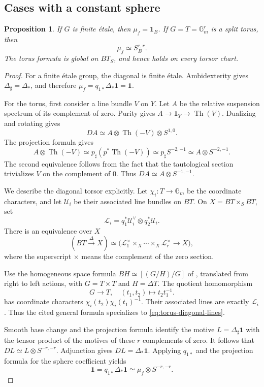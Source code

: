 \documentclass[11pt,reqno]{amsart}
\newtheorem{proposition}[theorem]{Proposition}
\theoremstyle{definition}
\theoremstyle{remark}
\theoremstyle{plain}
\numberwithin{equation}{section}
\newcommand{\one}{\mathbf 1}
\newcommand{\Gm}{\mathbb G_m}
\DeclareMathOperator{\Th}{Th}
\begin{document}
\subsection{Cases with a constant sphere}
\begin{proposition}\label{prop:new-finite-torus-twists}
If \(G\) is finite \'etale, then \(\mu_f=\one_B\).
If \(G=T=\Gm^r\) is a split torus, then
\[
 \mu_f\simeq S^{r,r}_B.
\]
The torus formula is global on \(BT_S\), and hence holds on every torsor chart.
\end{proposition}
\begin{proof}
For a finite \'etale group, the diagonal is finite \'etale.
Ambidexterity gives \(\Delta_\sharp=\Delta_*\), and therefore
\(\mu_f=q_{1*}\Delta_*\one=\one\).

For the torus, first consider a line bundle \(V\) on \(Y\).
Let \(A\) be the relative suspension spectrum of its complement of zero.
Purity gives \(A\to\one_Y\to\Th(V)\).
Dualizing and rotating gives
\[
 DA\simeq A\otimes\Th(-V)\otimes S^{1,0}.
\]
The projection formula gives
\[A\otimes\Th(-V) \simeq p_{\sharp}(p^*\Th(-V)) \simeq p_{\sharp}S^{-2, -1} 
\simeq A\otimes S^{-2,-1}.\]
The second equivalence follows from the fact that the tautological section trivializes \(V\)
on the complement of 0.
Thus \(DA\simeq A\otimes S^{-1,-1}\).

We describe the diagonal torsor explicitly.
Let \(\chi_i:T\to\Gm\) be the coordinate characters, and let
\(\mathcal U_i\) be their associated line bundles on \(BT\).
On \(X=BT\times_S BT\), set
\[
 \mathcal L_i=q_1^*\mathcal U_i^\vee\otimes q_2^*\mathcal U_i.
\]
There is an equivalence over \(X\)
\begin{equation}\label{eq:torus-diagonal-lines}
 (BT\xrightarrow{\Delta}X)\simeq
 \bigl(\mathcal L_1^\times\times_X\cdots\times_X
             \mathcal L_r^\times\longrightarrow X\bigr),
\end{equation}
where the superscript \(\times\) means the complement of the zero section.

Use the homogeneous space formula
\(BH\simeq[(G/H)/G]\) of
\cite[Corollary~1.16(a)]{IllusieZheng}, translated from right to left
actions, with \(G=T\times T\) and \(H=\Delta T\).
The quotient homomorphism
\[G \to T, \quad (t_1,t_2)\mapsto t_2t_1^{-1}.\]
has coordinate characters \(\chi_i(t_2)\chi_i(t_1)^{-1}\).
Their associated lines are exactly \(\mathcal L_i\).
Thus the cited general formula specializes to
\eqref{eq:torus-diagonal-lines}.

Smooth base change and the projection formula identify the motive
\(L=\Delta_\sharp\one\) with the tensor product of the motives of
these \(r\) complements of zero.
It follows that \(DL\simeq L\otimes S^{-r,-r}\).
Adjunction gives \(DL=\Delta_*\one\).
Applying \(q_{1*}\) and the projection formula for the sphere coefficient yields
\[
 \one=q_{1*}\Delta_*\one
 \simeq\mu_f\otimes S^{-r,-r}.
\]
\end{proof}
\end{document}

